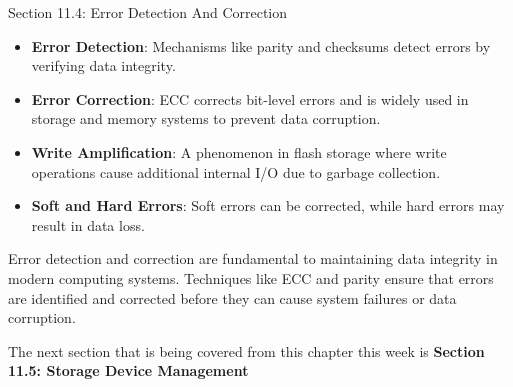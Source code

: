 \begin{notes}{Section 11.4: Error Detection And Correction}
\begin{highlight}
    \end{highlight}
    
    \begin{highlight}
    
        \begin{itemize}
            \item \textbf{Error Detection}: Mechanisms like parity and checksums detect errors by verifying data integrity.
            \item \textbf{Error Correction}: ECC corrects bit-level errors and is widely used in storage and memory systems to prevent data corruption.
            \item \textbf{Write Amplification}: A phenomenon in flash storage where write operations cause additional internal I/O due to garbage collection.
            \item \textbf{Soft and Hard Errors}: Soft errors can be corrected, while hard errors may result in data loss.
        \end{itemize}
    
    Error detection and correction are fundamental to maintaining data integrity in modern computing systems. Techniques like ECC and parity ensure that errors are identified and corrected before 
    they can cause system failures or data corruption.
    
    \end{highlight}

\end{notes}

The next section that is being covered from this chapter this week is \textbf{Section 11.5: Storage Device Management}

